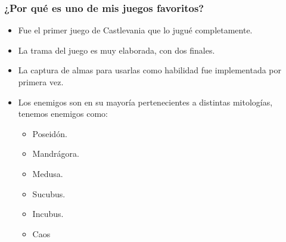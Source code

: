 \subsubsection{¿Por qué es uno de mis juegos favoritos?}
\begin{itemize}
	\item Fue el primer juego de Castlevania que lo jugué completamente.
	\item La trama del juego es muy elaborada, con dos finales.
	\item La captura de almas para usarlas como habilidad fue implementada por primera vez.
	\item Los enemigos son en su mayoría pertenecientes a distintas mitologías, tenemos enemigos como:
		\begin{itemize}
			\item Poseidón.
			\item Mandrágora.
			\item Medusa.
			\item Sucubus.
			\item Incubus.
			\item Caos
		\end{itemize}	
\end{itemize}